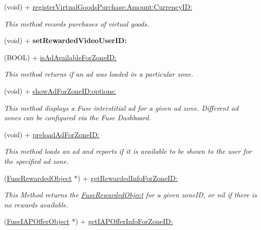 \begin{DoxyCompactItemize}
(void) + \hyperlink{interface_fuse_s_d_k_abd1bc1b2e677978fb0e559cd9f7a72a9}{register\+Virtual\+Goods\+Purchase\+:\+Amount\+:\+Currency\+I\+D\+:}
\begin{DoxyCompactList}\small\item\em This method records purchases of virtual goods. \end{DoxyCompactList}\item 
\hypertarget{interface_fuse_s_d_k_a61579033e1c61be4ee4567c4ed159dd0}{}(void) + {\bfseries set\+Rewarded\+Video\+User\+I\+D\+:}\label{interface_fuse_s_d_k_a61579033e1c61be4ee4567c4ed159dd0}

\item 
(B\+O\+O\+L) + \hyperlink{interface_fuse_s_d_k_abdf624c4ef56ee1c7cac73b37dc4f5fd}{is\+Ad\+Available\+For\+Zone\+I\+D\+:}
\begin{DoxyCompactList}\small\item\em This method returns if an ad was loaded in a particular zone. \end{DoxyCompactList}\item 
(void) + \hyperlink{interface_fuse_s_d_k_aba0c488866771c47887ac847c2cd884e}{show\+Ad\+For\+Zone\+I\+D\+:options\+:}
\begin{DoxyCompactList}\small\item\em This method displays a Fuse interstitial ad for a given ad zone. Different ad zones can be configured via the Fuse Dashboard. \end{DoxyCompactList}\item 
(void) + \hyperlink{interface_fuse_s_d_k_a2e80d673366877a4bcfc6fe86031d526}{preload\+Ad\+For\+Zone\+I\+D\+:}
\begin{DoxyCompactList}\small\item\em This method loads an ad and reports if it is available to be shown to the user for the specified ad zone. \end{DoxyCompactList}\item 
(\hyperlink{interface_fuse_rewarded_object}{Fuse\+Rewarded\+Object} $\ast$) + \hyperlink{interface_fuse_s_d_k_a89958c6b87beffac157ac028e9e29df1}{get\+Rewarded\+Info\+For\+Zone\+I\+D\+:}
\begin{DoxyCompactList}\small\item\em This Method returns the \hyperlink{interface_fuse_rewarded_object}{Fuse\+Rewarded\+Object} for a given zone\+I\+D, or nil if there is no rewards available. \end{DoxyCompactList}\item 
(\hyperlink{interface_fuse_i_a_p_offer_object}{Fuse\+I\+A\+P\+Offer\+Object} $\ast$) + \hyperlink{interface_fuse_s_d_k_a3314236b84929bbc6fb400ac72135691}{get\+I\+A\+P\+Offer\+Info\+For\+Zone\+I\+D\+:}

\end{DoxyCompactItemize}
